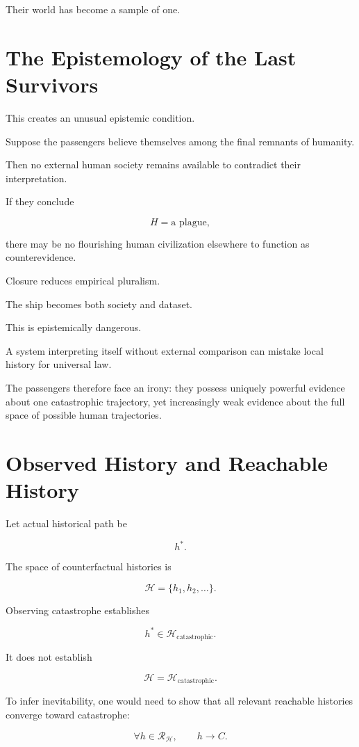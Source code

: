 \documentclass[11pt,oneside]{book}
\theoremstyle{definition}
\theoremstyle{remark}
\newcommand{\R}{\mathcal{R}}
\begin{document}
Their world has become a sample of one.

\section{The Epistemology of the Last Survivors}

This creates an unusual epistemic condition.

Suppose the passengers believe themselves among the final remnants of humanity.

Then no external human society remains available to contradict their interpretation.

If they conclude

\[
H=\text{a plague},
\]

there may be no flourishing human civilization elsewhere to function as counterevidence.

Closure reduces empirical pluralism.

The ship becomes both society and dataset.

This is epistemically dangerous.

A system interpreting itself without external comparison can mistake local history for universal law.

The passengers therefore face an irony: they possess uniquely powerful evidence about one catastrophic trajectory, yet increasingly weak evidence about the full space of possible human trajectories.

\section{Observed History and Reachable History}

Let actual historical path be

\[
h^\ast.
\]

The space of counterfactual histories is

\[
\mathcal H
=
\{h_1,h_2,\ldots\}.
\]

Observing catastrophe establishes

\[
h^\ast\in\mathcal H_{\mathrm{catastrophic}}.
\]

It does not establish

\[
\mathcal H
=
\mathcal H_{\mathrm{catastrophic}}.
\]

To infer inevitability, one would need to show that all relevant reachable histories converge toward catastrophe:

\[
\forall h\in\R_{\mathcal H},
\qquad
h\rightarrow C.
\]
\end{document}
